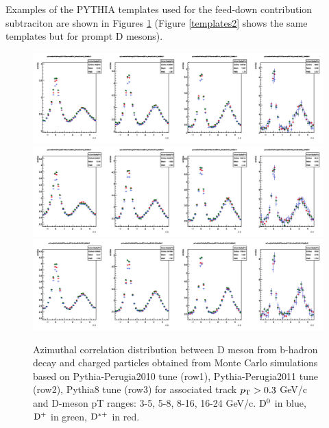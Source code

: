 Examples of the PYTHIA templates used for the feed-down contribution subtraciton are shown in Figures \ref{templates1} (Figure \ref{templates2} shows the same templates but for prompt D mesons).

\begin{figure}
\centering
\includegraphics[width=1\linewidth]{figures/Template/1DCompare_allDpTfromB_AssoPt_0dot3to99dot0GeVc_Perugia2010.png}
\includegraphics[width=1\linewidth]{figures/Template/1DCompare_allDpTfromB_AssoPt_0dot3to99dot0GeVc_Perugia2011.png}
\includegraphics[width=1\linewidth]{figures/Template/1DCompare_allDpTfromB_AssoPt_0dot3to99dot0GeVc_Pythia8.png}
\caption{Azimuthal correlation distribution between D meson from b-hadron decay and charged particles obtained from Monte Carlo simulations
based on Pythia-Perugia2010 tune (row1), Pythia-Perugia2011 tune (row2), Pythia8 tune (row3) for associated track $p_{\rm T} > 0.3$ GeV/c and D-meson pT ranges: 3-5, 5-8, 8-16, 16-24 GeV/c. ${\rm D^0}$ in blue, ${\rm D^+}$ in green, ${\rm D^{*+}}$ in red.}
\label{templates1}
\end{figure}

